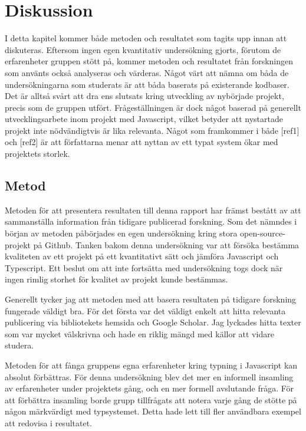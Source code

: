 \section{Diskussion}
\label{sec:alexander-discussion}

I detta kapitel kommer både metoden och resultatet som tagits upp innan att diskuteras. Eftersom ingen egen kvantitativ undersökning gjorts, förutom de erfarenheter gruppen stött på, kommer metoden och resultatet från forskningen som använts också analyseras och värderas.  Något värt att nämna om båda de undersökningarna som studerats är att båda baserats på existerande kodbaser. Det är alltså svårt att dra ens slutsats kring utveckling av nybörjade projekt, precis som de gruppen utfört. Frågeställningen är dock något baserad på generellt utvecklingsarbete inom projekt med Javascript, vilket betyder att nystartade projekt inte nödvändigtvis är lika relevanta. Något som framkommer i både [ref1] och [ref2] är att författarna menar att nyttan av ett typat system ökar med projektets storlek. 


\subsection{Metod}
\label{subsec:alexander-discussion-method}

Metoden för att presentera resultaten till denna rapport har främst bestått av att sammanställa information från tidigare publicerad forskning. Som det nämndes i början av metoden påbörjades en egen undersökning kring stora open-source-projekt på Github. Tanken bakom denna undersökning var att försöka bestämma kvaliteten av ett projekt på ett kvantitativt sätt och jämföra Javascript och Typescript. Ett beslut om att inte fortsätta med undersökning togs dock när ingen rimlig storhet för kvalitet av projekt kunde bestämmas.

Generellt tycker jag att metoden med att basera resultaten på tidigare forskning fungerade väldigt bra. För det första var det väldigt enkelt att hitta relevanta publicering via bibliotekets hemsida och Google Scholar. Jag lyckades hitta texter som var mycket välskrivna och hade en riklig mängd med källor att vidare studera.

Metoden för att fånga gruppens egna erfarenheter kring typning i Javascript kan absolut förbättras. För denna undersökning blev det mer en informell insamling av erfarenheter under projektets gång, och en mer formell avslutande fråga. För att förbättra insamling borde grupp tillfrågats att notera varje gång de stötte på någon märkvärdigt med typsystemet. Detta hade lett till fler användbara exempel att redovisa i resultatet.

